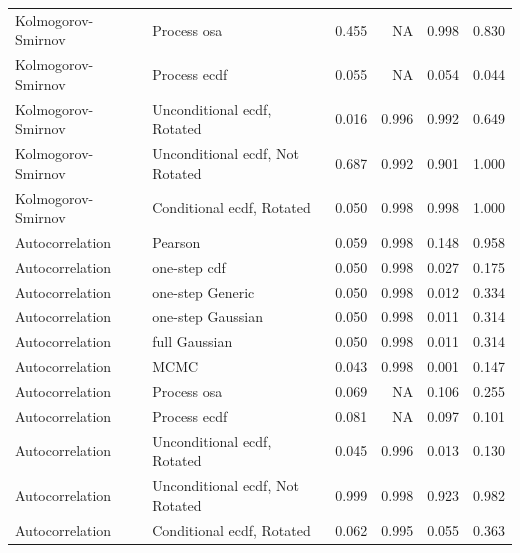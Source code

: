 \documentclass[
]{article}
\begin{document}
\begin{table}[H]
\begin{tabular}[t]{llrrrr}
Kolmogorov- Smirnov & Process osa & 0.455 & NA & 0.998 & 0.830\\
Kolmogorov- Smirnov & Process ecdf & 0.055 & NA & 0.054 & 0.044\\
Kolmogorov- Smirnov & Unconditional ecdf, Rotated & 0.016 & 0.996 & 0.992 & 0.649\\
\addlinespace
Kolmogorov- Smirnov & Unconditional ecdf, Not Rotated & 0.687 & 0.992 & 0.901 & 1.000\\
Kolmogorov- Smirnov & Conditional ecdf, Rotated & 0.050 & 0.998 & 0.998 & 1.000\\
Autocorrelation & Pearson & 0.059 & 0.998 & 0.148 & 0.958\\
Autocorrelation & one-step cdf & 0.050 & 0.998 & 0.027 & 0.175\\
Autocorrelation & one-step Generic & 0.050 & 0.998 & 0.012 & 0.334\\
\addlinespace
Autocorrelation & one-step Gaussian & 0.050 & 0.998 & 0.011 & 0.314\\
Autocorrelation & full Gaussian & 0.050 & 0.998 & 0.011 & 0.314\\
Autocorrelation & MCMC & 0.043 & 0.998 & 0.001 & 0.147\\
Autocorrelation & Process osa & 0.069 & NA & 0.106 & 0.255\\
Autocorrelation & Process ecdf & 0.081 & NA & 0.097 & 0.101\\
\addlinespace
Autocorrelation & Unconditional ecdf, Rotated & 0.045 & 0.996 & 0.013 & 0.130\\
Autocorrelation & Unconditional ecdf, Not Rotated & 0.999 & 0.998 & 0.923 & 0.982\\
Autocorrelation & Conditional ecdf, Rotated & 0.062 & 0.995 & 0.055 & 0.363\\
\bottomrule
\end{tabular}
\end{table}
\end{document}

